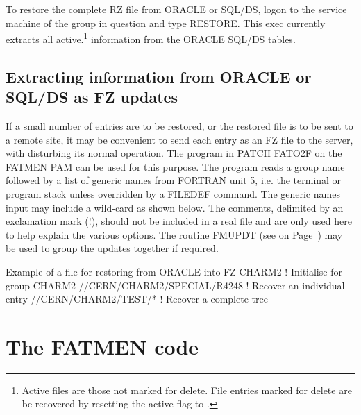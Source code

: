 To restore the complete RZ file from ORACLE or SQL/DS,
logon to the service
machine of the group in question and type RESTORE.
This exec currently extracts all
active.\footnote{Active files are those not marked for delete. File entries
marked for delete are be recovered by resetting the active flag to .}
information from the ORACLE SQL/DS tables.

\section{Extracting information from ORACLE or SQL/DS as FZ updates}

If a small number of entries are to be restored, or the restored
file is to be sent to a remote site, it may be convenient to
send each entry as an FZ file to the server, with disturbing
its normal operation. The program in PATCH FATO2F on the FATMEN
PAM can be used for this purpose. The program reads a group name
followed by a list of generic names from FORTRAN unit 5, i.e. the
terminal or program stack unless overridden by a FILEDEF command.
The generic names input may include a wild-card as shown below.
The comments, delimited by an exclamation mark (!), should not
be included in a real file and are only used here to help explain
the various options. The routine FMUPDT (see on Page~\pageref{FMUPDT})
may be used to group the updates together if required.
\begin{XMPt}{Example of a file for restoring from ORACLE into FZ}
CHARM2                                 ! Initialise for group CHARM2
//CERN/CHARM2/SPECIAL/R4248            ! Recover an individual entry
//CERN/CHARM2/TEST/*                   ! Recover a complete tree
\end{XMPt}
\chapter{The FATMEN code}
